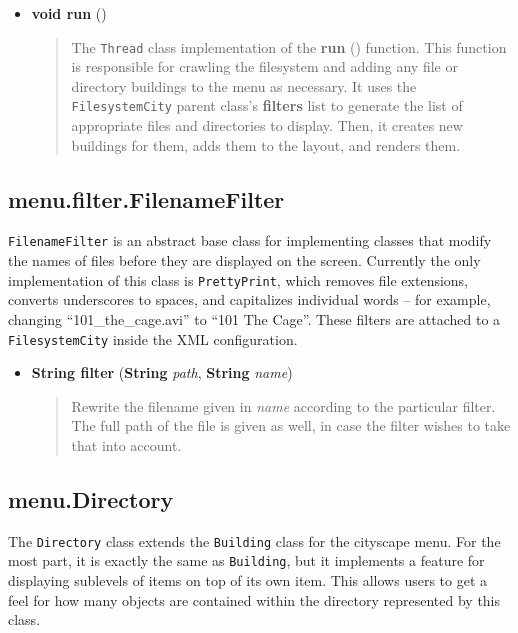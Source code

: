 \documentclass[letterpaper, titlepage, 11pt]{article}
\begin{document}
\begin{itemize}
\item[] \textbf{void run} ()
\begin{quotation}
The \texttt{Thread} class implementation of the \textbf{run} () function.  This function
is responsible for crawling the filesystem and adding any file or directory buildings
to the menu as necessary.  It uses the \texttt{FilesystemCity} parent class's
\textbf{filters} list to generate the list of appropriate files and directories to display.
Then, it creates new buildings for them, adds them to the layout, and renders them.
\end{quotation}
\end{itemize}

\subsection{menu.filter.FilenameFilter}
\texttt{FilenameFilter} is an abstract base class for implementing classes that
modify the names of files before they are displayed on the screen.  Currently
the only implementation of this class is \texttt{PrettyPrint}, which removes
file extensions, converts underscores to spaces, and capitalizes individual
words -- for example, changing ``101\_the\_cage.avi'' to ``101 The Cage''.
These filters are attached to a \texttt{FilesystemCity} inside the XML
configuration.

\begin{itemize}
\item[] \textbf{String filter} (\textbf{String} \textit{path}, \textbf{String} \textit{name})
\begin{quotation}
Rewrite the filename given in \textit{name} according to the particular filter.
The full path of the file is given as well, in case the filter wishes to take
that into account.
\end{quotation}
\end{itemize}

\subsection{menu.Directory}
The \texttt{Directory} class extends the \texttt{Building} class for the cityscape
menu.  For the most part, it is exactly the same as \texttt{Building}, but
it implements a feature for displaying sublevels of items on top of its own
item.  This allows users to get a feel for how many objects are contained
within the directory represented by this class.
\end{document}
